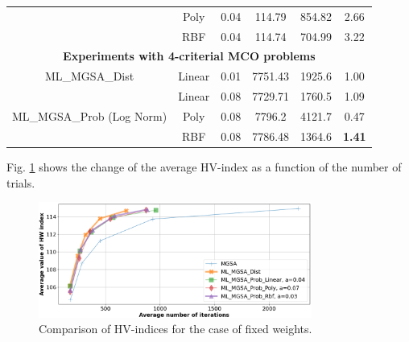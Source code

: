 \documentclass[runningheads]{llncs}
\begin{document}
\begin{table}[ht]
{\begin{tabular}{cccccc}
                                                                                           & Poly                  & 0.04                           & 114.79                 & 854.82              & 2.66                   \\
                                                                                           & RBF                   & 0.04                           & 114.74                 & 704.99              & 3.22                   \\ \hline
\multicolumn{6}{c}{\textbf{Experiments with 4-criterial MCO problems}}                                                                                                                                                      \\ \hline
ML\_MGSA\_Dist                                                                             & Linear                & 0.01                           & 7751.43                & 1925.6              & 1.00                   \\
\multirow{3}{*}{ML\_MGSA\_Prob (Log Norm)}                                                 & Linear                & 0.08                           & 7729.71                & 1760.5              & 1.09                   \\
                                                                                           & Poly                  & 0.08                           & 7796.2                 & 4121.7              & 0.47                   \\
                                                                                           & RBF                   & 0.08                           & 7786.48                & 1364.6              & \textbf{1.41}          \\ \hline
\end{tabular}%
}
\end{table}

Fig. \ref{fig:3} shows the change of the average HV-index as a function of the number of trials.
\begin{figure}
\centering
\includegraphics[width=0.8\textwidth]{fig3.png}
\caption{Comparison of HV-indices for the case of fixed weights.} 
\label{fig:3}
\end{figure}
\end{document}

